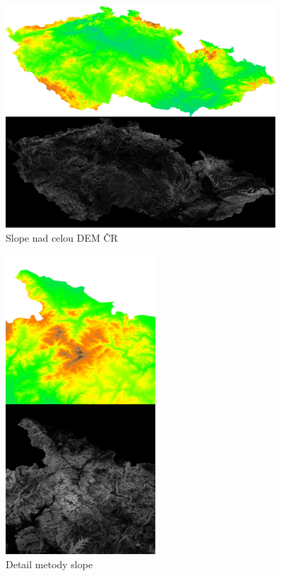 \documentclass[12pt,a4paper,titlepage,final]{report}
\begin{document}
\begin{figure}[ht]
\begin{center}
\includegraphics[width=0.9\textwidth]{images/slope_cr.jpg}
\caption{Slope nad celou DEM ČR}
\label{fig:slope-cr}
\end{center}
\end{figure}

\begin{figure}[ht]
\begin{center}
\includegraphics[width=0.5\textwidth]{images/slope_detail.jpg}
\caption{Detail metody slope}
\label{fig:slope-det}
\end{center}
\end{figure}
\end{document}

